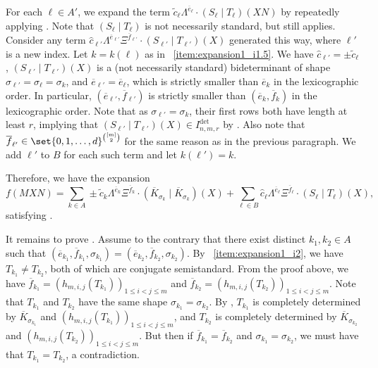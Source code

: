 \documentclass[letterpaper, 11pt]{amsart}
\begin{document}
\begin{pf}
For each $\ell\in A'$, we expand the term $\widetilde{c}_{\ell} \Lambda^{\overline{e}_\ell}\cdot (S_\ell\mid T_\ell)(XN)$ by repeatedly applying .
Note that $(S_\ell\mid T_\ell)$ is not necessarily standard, but  still applies.
Consider any term $\widehat{c}_{\ell'}\Lambda^{\overline{e}_{\ell'}}\Xi^{\overline{f}_{\ell'}}\cdot (S_{\ell'}\mid T_{\ell'})(X)$ generated this way, where $\ell'$ is a new index.
Let $k=k(\ell)$ as in ~\eqref{item:expansion1_i1.5}.
We have $\widehat{c}_{\ell'}=\pm\widetilde{c}_{\ell}$, $(S_{\ell'}\mid T_{\ell'})(X)$ is a (not necessarily standard) bideterminant of shape $\sigma_{\ell'}=\sigma_\ell=\sigma_k$, and $\overline{e}_{\ell'}=\overline{e}_\ell$, which is strictly smaller than $\overline{e}_k$ in the lexicographic order.
In particular, $(\overline{e}_{\ell'}, \overline{f}_{\ell'})$ is strictly smaller than $(\overline{e}_k, \overline{f}_k)$ in the lexicographic order.
Note that as $\sigma_{\ell'}=\sigma_k$, their first rows both have length at least $r$, implying that $(S_{\ell'}\mid T_{\ell'})(X)\in I^{\det}_{n,m,r}$ by .
Also note that $\overline{f}_{\ell'} \in \set{0,1,\dots,d}^{\binom{[m]}{2}}$ for the same reason as in the previous paragraph.
We add $\ell'$ to $B$ for each such term and let $k(\ell')=k$.

Therefore, we have the expansion
\[
    f(MXN) = \sum_{k \in A} \pm\widetilde{c}_{k} \Lambda^{\overline{e}_k}\Xi^{\overline{f}_k}\cdot (\overline{K}_{\sigma_k}\mid \overline{K}_{\sigma_k})(X) + \sum_{\ell \in B} \widehat{c}_{\ell} \Lambda^{\overline{e}_\ell}\Xi^{\overline{f}_\ell}\cdot (S_\ell\mid T_\ell)(X),
\]
satisfying .

It remains to prove .
Assume to the contrary that there exist distinct $k_1,k_2\in A$ such that $(\overline{e}_{k_1},\overline{f}_{k_1},\sigma_{k_1})=(\overline{e}_{k_2},\overline{f}_{k_2},\sigma_{k_2})$.
By ~\eqref{item:expansion1_i2}, we have $T_{k_1}\neq T_{k_2}$, both of which are conjugate semistandard.
From the proof above, we have $\overline{f}_{k_1}=(h_{m,i,j}(T_{k_1}))_{1\leq i<j\leq m}$ and $\overline{f}_{k_2}=(h_{m,i,j}(T_{k_2}))_{1\leq i<j\leq m}$.
Note that $T_{k_1}$ and $T_{k_2}$ have the same shape $\sigma_{k_1}=\sigma_{k_2}$.
By , $T_{k_1}$ is completely determined by $\overline{K}_{\sigma_{k_1}}$ and $(h_{m,i,j}(T_{k_1}))_{1\leq i<j\leq m}$, and $T_{k_2}$ is completely determined by $\overline{K}_{\sigma_{k_2}}$ and $(h_{m,i,j}(T_{k_2}))_{1\leq i<j\leq m}$.
But then if $\overline{f}_{k_1} = \overline{f}_{k_2}$ and $\sigma_{k_1} = \sigma_{k_2}$, we must have that $T_{k_1} = T_{k_2}$, a contradiction.
\end{pf}
\end{document}
